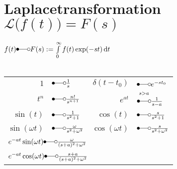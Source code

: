 \documentclass[german]{latex4ei/latex4ei_sheet}
\renewcommand{\diff}{\mathop{}\!\mathrm{\vphantom( d}}
\renewcommand{\laplace}{\Laplace}
\begin{document}
\section{Laplacetransformation \quad $\mathcal L\bigl(f(t)\bigr) = F(s)$}
\begin{sectionbox}
	$f(t) \laplace F(s) := \int\limits_0^\infty f(t) \exp(-st) \diff t$\\
	\\
	\everymath{\displaystyle}	%
	\begin{tabular}{rl|rl}
		$1$ & \!\!\!\!\!\!\!\!\!\!$\laplace \frac{1}{s}$ & $\delta(t-t_0)$ & \!\!\!\!\!\!\!\!\!\!$\laplace e^{-s t_0}$\\[0.2em]
		$t^n$ & \!\!\!\!\!\!\!\!\!\!$\laplace \frac{n!}{s^{n+1}}$ & $e^{at}$  & \!\!\!\!\!\!\!\!\!\!$\overset{s > a}{ \laplace } \frac{1}{s-a}$\\[0.5em] 
		$\sin(t)$ & \!\!\!\!\!\!\!\!\!\!$\laplace \frac{1}{s^2 + 1}$ & $\cos(t)$ & \!\!\!\!\!\!\!\!\!\!$\laplace \frac{s}{s^2 + 1}$\\[0.5em]
		$\sin(\omega t)$ & \!\!\!\!\!\!\!\!\!\!$\laplace \frac{\omega}{s^2 + \omega^2}$ & $\cos(\omega t)$ & \!\!\!\!\!\!\!\!\!\!$\laplace \frac{s}{s^2 + \omega^2}$\\[0.5em]
		\multicolumn{4}{l}{ $e^{-at} \sin(\omega t) \laplace \frac{\omega}{(s+a)^2+\omega^2}$} \\
		\multicolumn{4}{l}{ $e^{-at} \cos(\omega t) \laplace \frac{s+a}{(s+a)^2+\omega^2}$}\\ 		


\end{tabular}
\end{sectionbox}
\end{document}
